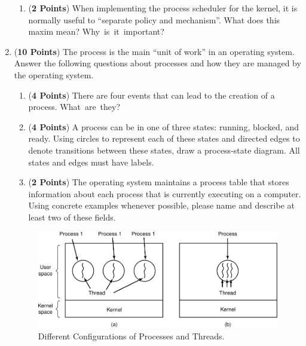 \documentclass[12pt,epsf,psfig,graphics]{article}
\begin{document}
\begin{enumerate}
\begin{enumerate}
    \item ({\bf 2 Points}) When implementing the process scheduler for the kernel, it is normally useful to ``separate
      policy and mechanism''.  What does this maxim mean? \mbox{Why is it important}?

  \end{enumerate}

  \newpage
  
\item ({\bf 10 Points}) The process is the main ``unit of work'' in an operating system.  Answer the following questions
  about processes and how they are managed by the operating system.

  \begin{enumerate}

    \item ({\bf 4 Points}) There are four events that can lead to the creation of a process. \mbox{What are they}?

    \item ({\bf 4 Points}) A process can be in one of three states: running, blocked, and ready. Using circles to
      represent each of these states and directed edges to denote transitions between these states, draw a process-state
      diagram. All states and edges must have labels.

    \item ({\bf 2 Points}) The operating system maintains a process table that stores information about each process
      that is currently executing on a computer. Using concrete examples whenever possible, please name and describe at
      least two of these fields.

  \end{enumerate}

  \newpage

  \begin{figure}[t]
    \centering
    \includegraphics{fig2-11}
    \caption{Different Configurations of Processes and Threads.}
    \label{fig:pandt}
  \end{figure}



\end{enumerate}
\end{document}
